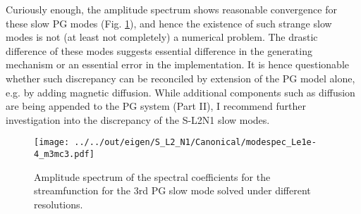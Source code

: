 Curiously enough, the amplitude spectrum shows reasonable convergence for these slow PG modes (Fig. \ref{fig:SL2N1-modespec-m3mc3}), and hence the existence of such strange slow modes is not (at least not completely) a numerical problem.
The drastic difference of these modes suggests essential difference in the generating mechanism or an essential error in the implementation. It is hence questionable whether such discrepancy can be reconciled by extension of the PG model alone, e.g. by adding magnetic diffusion. While additional components such as diffusion are being appended to the PG system (Part II), I recommend further investigation into the discrepancy of the S-L2N1 slow modes.
%
\begin{figure}[htbp]
    \centering
    \texttt{[image: ../../out/eigen/S\_L2\_N1/Canonical/modespec\_Le1e-4\_m3mc3.pdf]}
    \caption{Amplitude spectrum of the spectral coefficients for the streamfunction for the 3rd PG slow mode solved under different resolutions.}
    \label{fig:SL2N1-modespec-m3mc3}
\end{figure}


\clearpage

